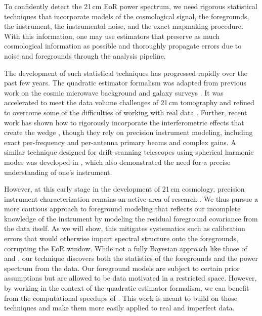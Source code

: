 To confidently detect the 21\,cm EoR power spectrum, we need rigorous statistical techniques that incorporate models of the cosmological signal, the foregrounds, the instrument, the instrumental noise, and the exact mapmaking procedure. With this information, one may use estimators that preserve as much cosmological information as possible and thoroughly propagate errors due to noise and foregrounds through the analysis pipeline.

The development of such statistical techniques has progressed rapidly over the past few years. The quadratic estimator formalism was adapted \citep{LT11} from previous work on the cosmic microwave background \citep{Maxpowerspeclossless} and galaxy surveys \citep{Maxgalaxysurvey1}. It was accelerated to meet the data volume challenges of 21\,cm tomography \citep{DillonFast} and refined to overcome some of the difficulties of working with real data \citep{X13}.  Further, recent work has shown how to rigorously incorporate the interferometric effects that create the wedge \citep{AdrianWedge1,AdrianWedge2,dillonmapmaking}, though they rely on precision instrument modeling, including exact per-frequency and per-antenna primary beams and complex gains. A similar technique designed for drift-scanning telescopes using spherical harmonic modes was developed in \citet{Richard,shaw15}, which also demonstrated the need for a precise understanding of one's instrument.

However, at this early stage in the development of 21\,cm cosmology, precision instrument characterization remains an active area of research \citep{sutinjo15,neben15,NewburghCHIMECal,pober12}. We thus pursue a more cautious approach to foreground modeling that reflects our incomplete knowledge of the instrument by modeling the residual foreground covariance from the data itself. As we will show, this mitigates systematics such as calibration errors that would otherwise impart spectral structure onto the foregrounds, corrupting the EoR window. While not a fully Bayesian approach like those of \citet{SutterBayesianImaging} and \citet{GibbsPSE}, our technique discovers both the statistics of the foregrounds and the power spectrum from the data. Our foreground models are subject to certain prior assumptions but are allowed to be data motivated in a restricted space. However, by working in the context of the quadratic estimator formalism, we can benefit from the computational speedups of \citet{DillonFast}. This work is meant to build on those techniques and make them more easily applied to real and imperfect data.

